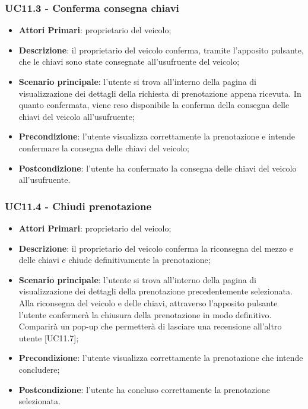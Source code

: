 \subsubsection{UC11.3 - Conferma consegna chiavi}
\begin{itemize}
	\item \textbf{Attori Primari}: proprietario del veicolo;
	\item \textbf{Descrizione}: il proprietario del veicolo conferma, tramite l'apposito pulsante, che le chiavi sono state consegnate all'usufruente del veicolo;
	\item \textbf{Scenario principale}: l'utente si trova all'interno della pagina di visualizzazione dei dettagli della richiesta di prenotazione appena ricevuta. In quanto confermata, viene reso disponibile la conferma della consegna delle chiavi del veicolo all'usufruente;
	\item \textbf{Precondizione}: l'utente visualizza correttamente la prenotazione e intende confermare la consegna delle chiavi del veicolo;
	\item \textbf{Postcondizione}: l'utente ha confermato la consegna delle chiavi del veicolo all'usufruente.
\end{itemize}
\subsubsection{UC11.4 - Chiudi prenotazione}
\begin{itemize}
	\item \textbf{Attori Primari}: proprietario del veicolo;
	\item \textbf{Descrizione}: il proprietario del veicolo conferma la riconsegna del mezzo e delle chiavi e chiude definitivamente la prenotazione;
	\item \textbf{Scenario principale}: l'utente si trova all'interno della pagina di visualizzazione dei dettagli della prenotazione precedentemente selezionata. Alla riconsegna del veicolo e delle chiavi, attraverso l'apposito pulsante l'utente confermerà la chiusura della prenotazione in modo definitivo. Comparirà un pop-up che permetterà di lasciare una recensione all'altro utente [UC11.7];
	\item \textbf{Precondizione}: l'utente visualizza correttamente la prenotazione che intende concludere;
	\item \textbf{Postcondizione}: l'utente ha concluso correttamente la prenotazione selezionata.
\end{itemize}
